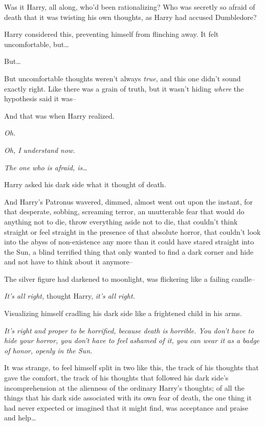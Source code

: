 Was it Harry, all along, who'd been rationalizing? Who was secretly so afraid of death that it was twisting his own thoughts, as Harry had accused Dumbledore?

Harry considered this, preventing himself from flinching away. It felt uncomfortable, but{\ldots}

But{\ldots}

But uncomfortable thoughts weren't always \emph{true}, and this one didn't sound exactly right. Like there was a grain of truth, but it wasn't hiding \emph{where} the hypothesis said it was\---

And that was when Harry realized.

\emph{Oh.}

\emph{Oh, I understand now.}

\emph{The one who is afraid, is{\ldots}}

Harry asked his dark side what it thought of death.

And Harry's Patronus wavered, dimmed, almost went out upon the instant, for that desperate, sobbing, screaming terror, an unutterable fear that would do anything not to die, throw everything aside not to die, that couldn't think straight or feel straight in the presence of that absolute horror, that couldn't look into the abyss of non-existence any more than it could have stared straight into the Sun, a blind terrified thing that only wanted to find a dark corner and hide and not have to think about it anymore\---

The silver figure had darkened to moonlight, was flickering like a failing candle\---

\emph{It's all right,} thought Harry, \emph{it's all right.}

Visualizing himself cradling his dark side like a frightened child in his arms.

\emph{It's right and proper to be horrified, because death is horrible. You don't have to hide your horror, you don't have to feel ashamed of it, you can wear it as a badge of honor, openly in the Sun.}

It was strange, to feel himself split in two like this, the track of his thoughts that gave the comfort, the track of his thoughts that followed his dark side's incomprehension at the alienness of the ordinary Harry's thoughts; of all the things that his dark side associated with its own fear of death, the one thing it had never expected or imagined that it might find, was acceptance and praise and help{\ldots}

